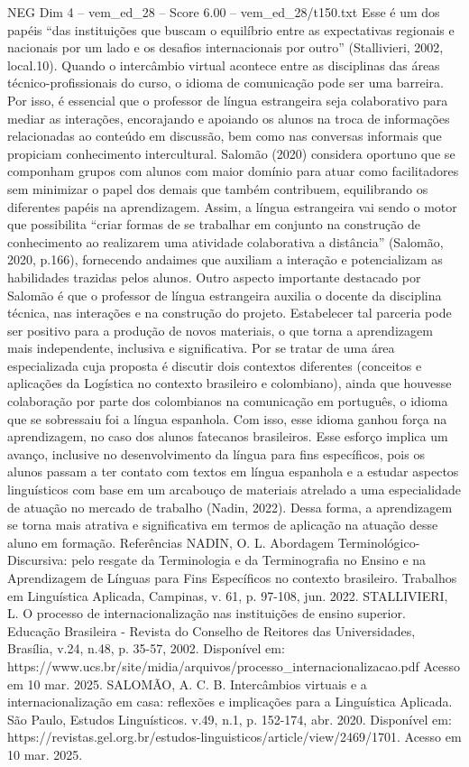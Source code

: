 \begin{textsample}{NEG Dim 4 – vem\_ed\_28 – Score 6.00 – vem\_ed\_28/t150.txt}
Esse é um dos papéis “das instituições que buscam o equilíbrio entre as expectativas regionais e nacionais por um lado e os desafios internacionais por outro” (Stallivieri, 2002, local.10).
Quando o intercâmbio virtual acontece entre as disciplinas das áreas técnico-profissionais do curso, o idioma de comunicação pode ser uma barreira.
Por isso, é essencial que o professor de língua estrangeira seja colaborativo para mediar as interações, encorajando e apoiando os alunos na troca de informações relacionadas ao conteúdo em discussão, bem como nas conversas informais que propiciam conhecimento intercultural.
Salomão (2020) considera oportuno que se componham grupos com alunos com maior domínio para atuar como facilitadores sem minimizar o papel dos demais que também contribuem, equilibrando os diferentes papéis na aprendizagem.
Assim, a língua estrangeira vai sendo o motor que possibilita “criar formas de se trabalhar em conjunto na construção de conhecimento ao realizarem uma atividade colaborativa a distância” (Salomão, 2020, p.166), fornecendo andaimes que auxiliam a interação e potencializam as habilidades trazidas pelos alunos.
Outro aspecto importante destacado por Salomão é que o professor de língua estrangeira auxilia o docente da disciplina técnica, nas interações e na construção do projeto.
Estabelecer tal parceria pode ser positivo para a produção de novos materiais, o que torna a aprendizagem mais independente, inclusiva e significativa.
Por se tratar de uma área especializada cuja proposta é discutir dois contextos diferentes (conceitos e aplicações da Logística no contexto brasileiro e colombiano), ainda que houvesse colaboração por parte dos colombianos na comunicação em português, o idioma que se sobressaiu foi a língua espanhola.
Com isso, esse idioma ganhou força na aprendizagem, no caso dos alunos fatecanos brasileiros.
Esse esforço implica um avanço, inclusive no desenvolvimento da língua para fins específicos, pois os alunos passam a ter contato com textos em língua espanhola e a estudar aspectos linguísticos com base em um arcabouço de materiais atrelado a uma especialidade de atuação no mercado de trabalho (Nadin, 2022).
Dessa forma, a aprendizagem se torna mais atrativa e significativa em termos de aplicação na atuação desse aluno em formação.
Referências NADIN, O.
L.
Abordagem Terminológico-Discursiva: pelo resgate da Terminologia e da Terminografia no Ensino e na Aprendizagem de Línguas para Fins Específicos no contexto brasileiro.
Trabalhos em Linguística Aplicada, Campinas, v. 61, p. 97-108, jun. 2022.
STALLIVIERI, L.
O processo de internacionalização nas instituições de ensino superior.
Educação Brasileira - Revista do Conselho de Reitores das Universidades, Brasília, v.24, n.48, p. 35-57, 2002.
Disponível em: https://www.ucs.br/site/midia/arquivos/processo\_internacionalizacao.pdf Acesso em 10 mar. 2025.
SALOMÃO, A.
C.
B.
Intercâmbios virtuais e a internacionalização em casa: reflexões e implicações para a Linguística Aplicada.
São Paulo, Estudos Linguísticos. v.49, n.1, p. 152-174, abr. 2020.
Disponível em: https://revistas.gel.org.br/estudos-linguisticos/article/view/2469/1701.
Acesso em 10 mar. 2025.

\end{textsample}
